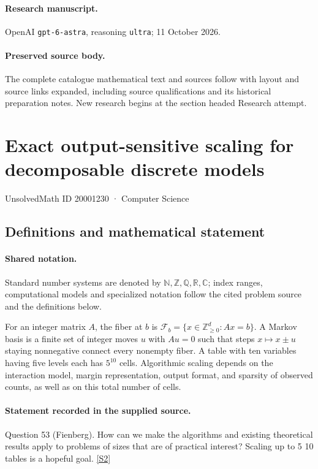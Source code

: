 \documentclass[11pt]{article}
\begin{document}
\paragraph{Research manuscript.} OpenAI \texttt{gpt-6-astra}, reasoning \texttt{ultra}; 11 October 2026.
\paragraph{Preserved source body.} The complete catalogue mathematical text and sources follow with layout and source links expanded, including source qualifications and its historical preparation notes. New research begins at the section headed Research attempt.

\section{Exact output-sensitive scaling for decomposable discrete models}\label{20001230}
{\small UnsolvedMath ID 20001230 · Computer Science}
\subsection{Definitions and mathematical statement}

\paragraph{Shared notation.}Standard number systems are denoted by $\mathbb N,\mathbb Z,\mathbb Q,\mathbb R,\mathbb C$; index ranges, computational models and specialized notation follow the cited problem source and the definitions below.


For an integer matrix $A$, the fiber at $b$ is $\mathcal F_b=\{x\in\mathbb Z_{\ge0}^d:Ax=b\}$. A Markov basis is a finite set of integer moves $u$ with $Au=0$ such that steps $x\mapsto x\pm u$ staying nonnegative connect every nonempty fiber. A table with ten variables having five levels each has $5^{10}$ cells. Algorithmic scaling depends on the interaction model, margin representation, output format, and sparsity of observed counts, as well as on this total number of cells.
\paragraph{Statement recorded in the supplied source.}
Question 53 (Fienberg). How can we make the algorithms and existing theoretical results apply to problems of sizes that are of practical interest? Scaling up to 5 10 tables is a hopeful goal. \href{https://aimath.org/WWN/compalgstat/compalgstat.pdf}{[S2]}
\end{document}
